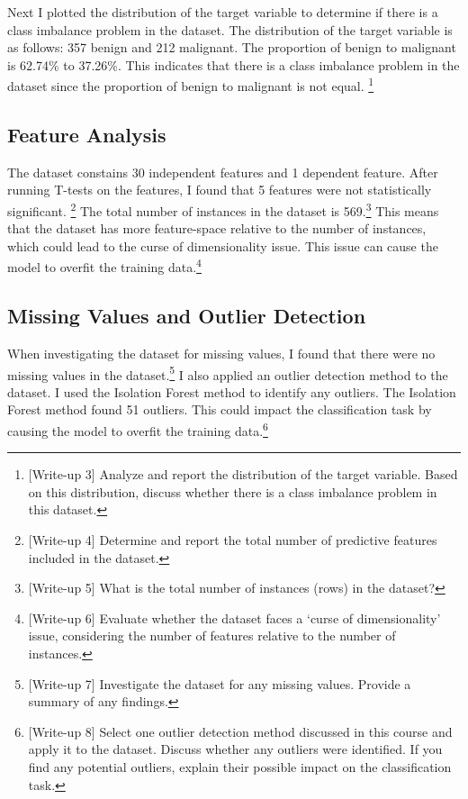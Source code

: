 \documentclass{labReport}
\begin{document}
\begin{multicols*}{2}
    Next I plotted the distribution of the target variable to determine if there is a class imbalance problem in the dataset. The distribution of the target variable is as follows: 357 benign and 212 malignant. The proportion of benign to malignant is 62.74\% to 37.26\%. This indicates that there is a class imbalance problem in the dataset since the proportion of benign to malignant is not equal. \footnote{[Write-up 3] Analyze and report the distribution of the target variable. Based on this distribution, discuss whether there is a class imbalance problem in this dataset.}

    \subsection{Feature Analysis}
    The dataset constains 30 independent features and 1 dependent feature. After running T-tests on the features, I found that 5 features were not statistically significant.
    \footnote{[Write-up 4] Determine and report the total number of predictive features included in the dataset.} The total number of instances in the dataset is 569.\footnote{[Write-up 5] What is the total number of instances (rows) in the dataset?} This means that the dataset has more feature-space relative to the number of instances, which could lead to the curse of dimensionality issue. This issue can cause the model to overfit the training data.\footnote{[Write-up 6] Evaluate whether the dataset faces a ‘curse of dimensionality’ issue, considering the number of features relative to the number of instances.}

    \subsection{Missing Values and Outlier Detection}

    When investigating the dataset for missing values, I found that there were no missing values in the dataset.\footnote{[Write-up 7] Investigate the dataset for any missing values. Provide a summary of any findings.} I also applied an outlier detection method to the dataset. I used the Isolation Forest method to identify any outliers. The Isolation Forest method found 51 outliers. This could impact the classification task by causing the model to overfit the training data.\footnote{[Write-up 8] Select one outlier detection method discussed in this course and apply it to the dataset. Discuss whether any outliers were identified. If you find any potential outliers, explain their possible impact on the classification task.}


\end{multicols*}
\end{document}
